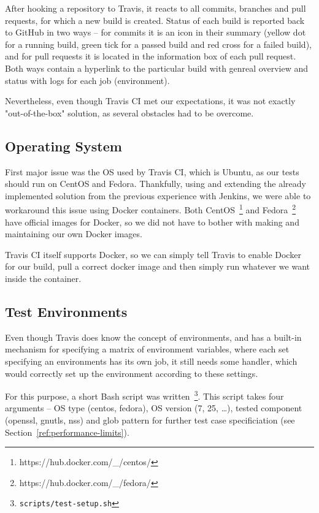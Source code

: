     After hooking a repository to Travis, it reacts to all commits, branches
    and pull requests, for which a new build is created. Status of each build
    is reported back to GitHub in two ways -- for commits it is an icon
    in their summary (yellow dot for a running build, green tick for a passed
    build and red cross for a failed build), and for pull requests it is located
    in the information box of each pull request. Both ways contain
    a hyperlink to the particular
    build with genreal overview and status with logs for each job (environment).

    Nevertheless, even though Travis CI met our expectations, it was not exactly
    "out-of-the-box" solution, as several obstacles had to be overcome.

\subsection{Operating System}
    First major issue was the OS used by Travis CI, which is Ubuntu, as our
    tests should run on CentOS and Fedora. Thankfully, using and extending the
    already implemented solution from the previous experience with
    Jenkins, we were able to workaround this issue using Docker containers.
    Both CentOS~\footnote{https://hub.docker.com/\_/centos/} and
    Fedora~\footnote{https://hub.docker.com/\_/fedora/} have official images
    for Docker, so we did not have to bother with making and maintaining our
    own Docker images.

    Travis CI itself supports Docker, so we can simply tell Travis to enable
    Docker for our build, pull a correct docker image and then simply run
    whatever we want inside the container.

\subsection{Test Environments}
    Even though Travis does know the concept of environments, and has a built-in
    mechanism for specifying a matrix of environment variables, where each
    set specifying an environments has its own job, it still needs some handler,
    which would correctly set up the environment according to these settings.

    For this purpose, a short Bash script was written~\footnote{\texttt{scripts/test-setup.sh}}.
    This script takes four arguments -- OS type
    (centos, fedora), OS version (7, 25, \dots), tested component (openssl, gnutls,
    nss) and glob pattern for further test case specificiation
    (see Section~\ref{ref:performance-limits}).

